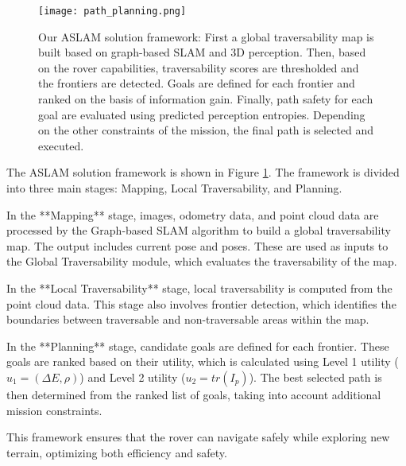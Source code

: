 \documentclass{article}
\begin{document}
\begin{center}
    \begin{figure}[h]
        \texttt{[image: path\_planning.png]}
        \caption{Our ASLAM solution framework: First a global traversability map is built based on graph-based SLAM and 3D perception. Then, based on the rover capabilities, traversability scores are thresholded and the frontiers are detected. Goals are defined for each frontier and ranked on the basis of information gain. Finally, path safety for each goal are evaluated using predicted perception entropies. Depending on the other constraints of the mission, the final path is selected and executed.}
        \label{fig:path_planning}
    \end{figure}
\end{center}

The ASLAM solution framework is shown in Figure \ref{fig:path_planning}. The framework is divided into three main stages: Mapping, Local Traversability, and Planning.

In the **Mapping** stage, images, odometry data, and point cloud data are processed by the Graph-based SLAM algorithm to build a global traversability map. The output includes current pose and poses. These are used as inputs to the Global Traversability module, which evaluates the traversability of the map.

In the **Local Traversability** stage, local traversability is computed from the point cloud data. This stage also involves frontier detection, which identifies the boundaries between traversable and non-traversable areas within the map.

In the **Planning** stage, candidate goals are defined for each frontier. These goals are ranked based on their utility, which is calculated using Level 1 utility ($u_1 = (\Delta E, \rho)$) and Level 2 utility ($u_2 = tr(I_p)$). The best selected path is then determined from the ranked list of goals, taking into account additional mission constraints.

This framework ensures that the rover can navigate safely while exploring new terrain, optimizing both efficiency and safety.
\end{document}
